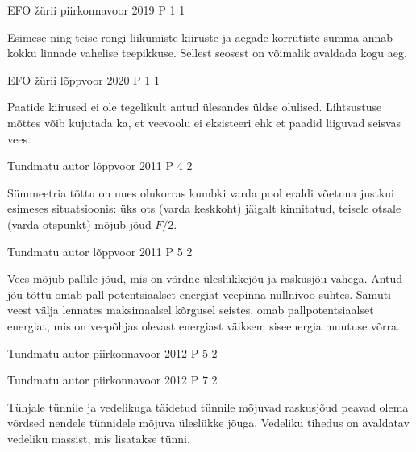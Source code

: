 \documentclass[11pt]{article}
\begin{document}
{%
{EFO žürii} %
{piirkonnavoor} %
{2019} %
{P 1} %
{1} %
{

\ifHint
Esimese ning teise rongi liikumiste kiiruste ja aegade korrutiste summa annab kokku linnade vahelise teepikkuse. Sellest seosest on võimalik avaldada kogu aeg. 
\fi
}

{EFO žürii} %
{lõppvoor} %
{2020} %
{P 1} %
{1} %
{

\ifHint
Paatide kiirused ei ole tegelikult antud ülesandes üldse olulised. Lihtsustuse mõttes võib kujutada ka, et veevoolu ei eksisteeri ehk et paadid liiguvad seisvas vees.
\fi
}


{Tundmatu autor} %
{lõppvoor} %
{2011} %
{P 4} %
{2} %
{

\ifHint
Sümmeetria tõttu on uues olukorras kumbki varda pool eraldi võetuna justkui esimeses situatsioonis: üks ots (varda keskkoht) jäigalt kinnitatud, teisele otsale (varda otspunkt) mõjub jõud $F/2$.
\fi
}


{Tundmatu autor} %
{lõppvoor} %
{2011} %
{P 5} %
{2} %
{

\ifHint
Vees mõjub pallile jõud, mis on võrdne üleslükkejõu ja raskusjõu vahega. Antud jõu tõttu omab pall potentsiaalset energiat veepinna nullnivoo suhtes. Samuti veest välja lennates maksimaalsel kõrgusel seistes, omab pallpotentsiaalset energiat, mis on veepõhjas olevast energiast väiksem siseenergia muutuse võrra.
\fi
}

{Tundmatu autor} %
{piirkonnavoor} %
{2012} %
{P 5} %
{2} %
{

\ifHint

\fi
}


{Tundmatu autor} %
{piirkonnavoor} %
{2012} %
{P 7} %
{2} %
{

\ifHint
Tühjale tünnile ja vedelikuga täidetud tünnile mõjuvad raskusjõud peavad olema võrdsed nendele tünnidele mõjuva üleslükke jõuga. Vedeliku tihedus on avaldatav vedeliku massist, mis lisatakse tünni.
\fi
}

}
\end{document}
